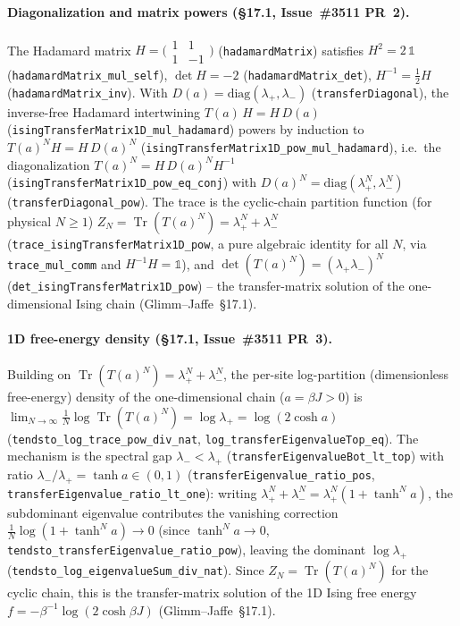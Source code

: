 \documentclass[a4paper,11pt]{article}
\begin{document}
\paragraph{Diagonalization and matrix powers (\S17.1, Issue~\#3511 PR~2).}
The Hadamard matrix $H = \bigl(\begin{smallmatrix} 1 & 1 \\ 1 & -1 \end{smallmatrix}\bigr)$
(\texttt{hadamardMatrix}) satisfies $H^2 = 2\,\mathbb 1$
(\texttt{hadamardMatrix\_mul\_self}), $\det H = -2$
(\texttt{hadamardMatrix\_det}), $H^{-1} = \tfrac12 H$
(\texttt{hadamardMatrix\_inv}). With $D(a) = \mathrm{diag}(\lambda_+, \lambda_-)$
(\texttt{transferDiagonal}), the inverse-free Hadamard intertwining
$T(a)\,H = H\,D(a)$ (\texttt{isingTransferMatrix1D\_mul\_hadamard}) powers by
induction to $T(a)^N H = H\,D(a)^N$
(\texttt{isingTransferMatrix1D\_pow\_mul\_hadamard}), i.e.\ the diagonalization
$T(a)^N = H\,D(a)^N H^{-1}$ (\texttt{isingTransferMatrix1D\_pow\_eq\_conj}) with
$D(a)^N = \mathrm{diag}(\lambda_+^N, \lambda_-^N)$
(\texttt{transferDiagonal\_pow}). The trace is the cyclic-chain partition
function (for physical $N \ge 1$) $Z_N = \operatorname{Tr}(T(a)^N) = \lambda_+^N + \lambda_-^N$
(\texttt{trace\_isingTransferMatrix1D\_pow}, a pure algebraic identity for all $N$, via \texttt{trace\_mul\_comm} and
$H^{-1}H = \mathbb 1$), and $\det(T(a)^N) = (\lambda_+\lambda_-)^N$
(\texttt{det\_isingTransferMatrix1D\_pow}) -- the transfer-matrix solution of the
one-dimensional Ising chain (Glimm--Jaffe~\S17.1).

\paragraph{1D free-energy density (\S17.1, Issue~\#3511 PR~3).}
Building on $\operatorname{Tr}(T(a)^N) = \lambda_+^N + \lambda_-^N$, the per-site
log-partition (dimensionless free-energy) density of the one-dimensional chain
($a = \beta J > 0$) is
$\lim_{N\to\infty} \tfrac1N \log \operatorname{Tr}(T(a)^N) = \log \lambda_+ = \log(2\cosh a)$
(\texttt{tendsto\_log\_trace\_pow\_div\_nat}, \texttt{log\_transferEigenvalueTop\_eq}).
The mechanism is the spectral gap $\lambda_- < \lambda_+$
(\texttt{transferEigenvalueBot\_lt\_top}) with ratio
$\lambda_-/\lambda_+ = \tanh a \in (0,1)$
(\texttt{transferEigenvalue\_ratio\_pos}, \texttt{transferEigenvalue\_ratio\_lt\_one}):
writing $\lambda_+^N + \lambda_-^N = \lambda_+^N (1 + \tanh^N a)$, the subdominant
eigenvalue contributes the vanishing correction
$\tfrac1N \log(1 + \tanh^N a) \to 0$ (since $\tanh^N a \to 0$,
\texttt{tendsto\_transferEigenvalue\_ratio\_pow}), leaving the dominant
$\log\lambda_+$ (\texttt{tendsto\_log\_eigenvalueSum\_div\_nat}).  Since
$Z_N = \operatorname{Tr}(T(a)^N)$ for the cyclic chain, this is the transfer-matrix
solution of the 1D Ising free energy $f = -\beta^{-1}\log(2\cosh\beta J)$
(Glimm--Jaffe~\S17.1).
\end{document}

